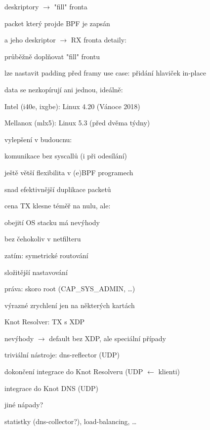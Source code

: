 
\bulletList
\item deskriptory $\to$ "fill" fronta
\item packet který projde BPF je zapsán
\item a jeho deskriptor $\to$ RX fronta
\endBulletList
detaily:
\bulletList
\item průběžně doplňovat "fill" frontu
\item lze nastavit padding před framy
	use case: přidání hlaviček in-place
\endBulletList

\rightColumn
\bigskip\bigskip\bigskip\smallskip
\hfill{}\par
\endColumn



data se nezkopírují ani jednou, ideálně:
\bulletList
\item Intel (i40e, ixgbe): Linux 4.20 (Vánoce 2018)
\item Mellanox (mlx5): Linux 5.3 (před dvěma týdny)
\endBulletList

vylepšení v budoucnu:
\bulletList
\item komunikace bez syscallů (i při odesílání)
\item ještě větší flexibilita v (e)BPF programech
\item snad efektivnější duplikace packetů
\endBulletList



cena TX klesne téměř na nulu, ale:
\bulletList
\item obejití OS stacku má nevýhody
	\bulletList
	\item bez čehokoliv v netfilteru
	\item zatím: symetrické routování
	\endBulletList
\item složitější nastavování
\item práva: skoro root (CAP\_SYS\_ADMIN, \dots)
\item výrazné zrychlení jen na některých kartách
\endBulletList

\rightColumn
\smallskip
{}
\par\hfill Knot Resolver: TX s XDP
\endColumn



nevýhody $\to$ default bez XDP, ale speciální případy
\bulletList
\item triviální nástroje: dns-reflector (UDP)
\item dokončení integrace do Knot Resolveru (UDP $\leftarrow$ klienti)
\item integrace do Knot DNS (UDP)
\item {}
\endBulletList
\medskip
\bulletList
\item jiné nápady?
\par statistky (dns-collector?), load-balancing, \dots
\endBulletList


